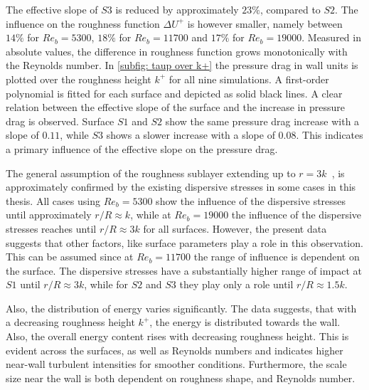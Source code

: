 The effective slope of $S3$ is reduced by approximately $23\%$, compared to $S2$.
The influence on the roughness function $\Delta U^+$ is however smaller, namely between $14\%$ for $Re_b = 5300$, $18\%$ for $Re_b = 11700$ and $17\%$ for $Re_b = 19000$.
Measured in absolute values, the difference in roughness function grows monotonically with the Reynolds number.
In \autoref{subfig: taup over k+} the pressure drag in wall units is plotted over the roughness height $k^+$ for all nine simulations.
A first-order polynomial is fitted for each surface and depicted as solid black lines.
A clear relation between the effective slope of the surface and the increase in pressure drag is observed.
Surface $S1$ and $S2$ show the same pressure drag increase with a slope of $0.11$, while $S3$ shows a slower increase with a slope of $0.08$.
This indicates a primary influence of the effective slope on the pressure drag.


The general assumption of the roughness sublayer extending up to $r = 3k$~\citep{chungPredictingDragRough2021}, is approximately confirmed by the existing dispersive stresses in some cases in this thesis.
All cases using $Re_b = 5300$ show the influence of the dispersive stresses until approximately $r/R \approx k$, while at $Re_b = 19000$ the influence of the dispersive stresses reaches until $r/R \approx 3k$ for all surfaces.
However, the present data suggests that other factors, like surface parameters play a role in this observation.
This can be assumed since at $Re_b = 11700$ the range of influence is dependent on the surface.
The dispersive stresses have a substantially higher range of impact at $S1$ until $r/R \approx 3k$, while for $S2$ and $S3$ they play only a role until $r/R \approx 1.5k$.

Also, the distribution of energy varies significantly.
The data suggests, that with a decreasing roughness height $k^+$, the energy is distributed towards the wall.
Also, the overall energy content rises with decreasing roughness height.
This is evident across the surfaces, as well as Reynolds numbers and indicates higher near-wall turbulent intensities for smoother conditions.
Furthermore, the scale size near the wall is both dependent on roughness shape, and Reynolds number.